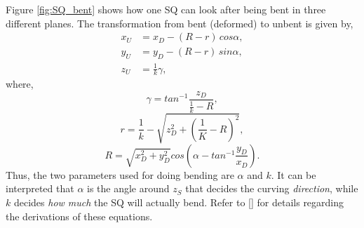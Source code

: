 Figure \ref{fig:SQ_bent} shows how one \gls{SQ} can look after being bent in three different planes. The transformation from bent (deformed) to unbent is given by,
\begin{align}
x_U&= x_D - (R - r)\,cos\alpha, \\
y_U&= y_D - (R - r)\,sin\alpha, \\
z_U&= \frac{1}{k}\gamma,
\end{align}
where,
\begin{equation}
\gamma = tan^{-1}\frac{z_D}{\frac{1}{k} - R},
\end{equation} 
\begin{equation}
r = \frac{1}{k} - \sqrt{z_D^2 + (\frac{1}{K} - R)^2},
\end{equation}
\begin{equation}
R = \sqrt{x_D^2 + y_D^2}cos\left(\alpha - tan^{-1} \frac{y_D}{x_D}\right).
\end{equation}
Thus, the two parameters used for doing bending are $\alpha$ and $k$. It can be interpreted that $\alpha$ is the angle around $z_S$ that decides the curving \textit{direction}, while $k$ decides \textit{how much} the \gls{SQ} will actually bend. Refer to [\citeauthor{Jaklic2000}] for details regarding the derivations of these equations.

